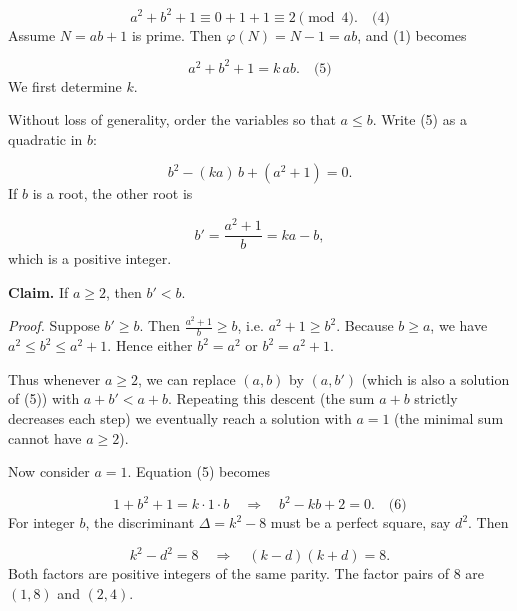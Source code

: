 \[
a^{2}+b^{2}+1 \equiv 0+1+1 \equiv 2 \pmod{4}. \quad\text{(4)}
\]
\smallskip
{}
Assume \(N = ab+1\) is prime. Then \(\varphi(N) = N-1 = ab\), and (1) becomes\par
\[
a^{2}+b^{2}+1 = k\,ab. \quad\text{(5)}
\]
We first determine \(k\).\par
{}
Without loss of generality, order the variables so that \(a \le b\). Write (5) as a quadratic in \(b\):\par
\[
b^{2} - (k a)\,b + (a^{2}+1) = 0.
\]
If \(b\) is a root, the other root is\par
\[
b' = \frac{a^{2}+1}{b} = k a - b,
\]
which is a positive integer.\par
\textbf{Claim.} If \(a \ge 2\), then \(b' < b\).\par
\emph{Proof.} Suppose \(b' \ge b\). Then \(\frac{a^{2}+1}{b} \ge b\), i.e. \(a^{2}+1 \ge b^{2}\). Because \(b \ge a\), we have \(a^{2} \le b^{2} \le a^{2}+1\). Hence either \(b^{2}=a^{2}\) or \(b^{2}=a^{2}+1\).\par
{}
Thus whenever \(a \ge 2\), we can replace \((a,b)\) by \((a,b')\) (which is also a solution of (5)) with \(a+b' < a+b\). Repeating this descent (the sum \(a+b\) strictly decreases each step) we eventually reach a solution with \(a=1\) (the minimal sum cannot have \(a \ge 2\)).\par
Now consider \(a=1\). Equation (5) becomes\par
\[
1 + b^{2} + 1 = k \cdot 1 \cdot b \quad\Longrightarrow\quad b^{2} - k b + 2 = 0. \quad\text{(6)}
\]
For integer \(b\), the discriminant \(\Delta = k^{2}-8\) must be a perfect square, say \(d^{2}\). Then\par
\[
k^{2} - d^{2} = 8 \quad\Longrightarrow\quad (k-d)(k+d)=8.
\]
Both factors are positive integers of the same parity. The factor pairs of \(8\) are \((1,8)\) and \((2,4)\).\par
{}
